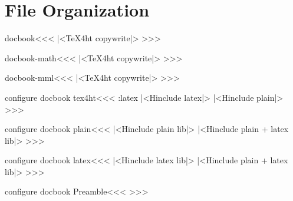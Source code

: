 %

\ifx \HTML\UnDef
   \def\HTML{docbook,docbook-math,docbook-mml}                         
   \def\CONFIG{\jobname}
   \def\MAKETITLE{\title{Source for DocBook}%
                  \author{Eitan M. Gurari}}   
   \def\PREAMBLE{\usepackage{url}}
   \def\next{  \endinput}
   \expandafter\next
\fi




\chapter{File Organization}



\<docbook\><<<
|<TeX4ht copywrite|>
>>>


\<docbook-math\><<<
|<TeX4ht copywrite|>
>>>


\<docbook-mml\><<<
|<TeX4ht copywrite|>
>>>


\<configure docbook tex4ht\><<<
\if:latex  |<Hinclude latex|>
\else      |<Hinclude plain|>  \fi
>>>

\<configure docbook plain\><<<
|<Hinclude plain lib|>
|<Hinclude plain + latex lib|>
>>>

\<configure docbook latex\><<<
|<Hinclude latex lib|>
|<Hinclude plain + latex lib|>
>>>

\<configure docbook Preamble\><<<    
\edef\Preamble{\Preamble,refcaption}
>>>


